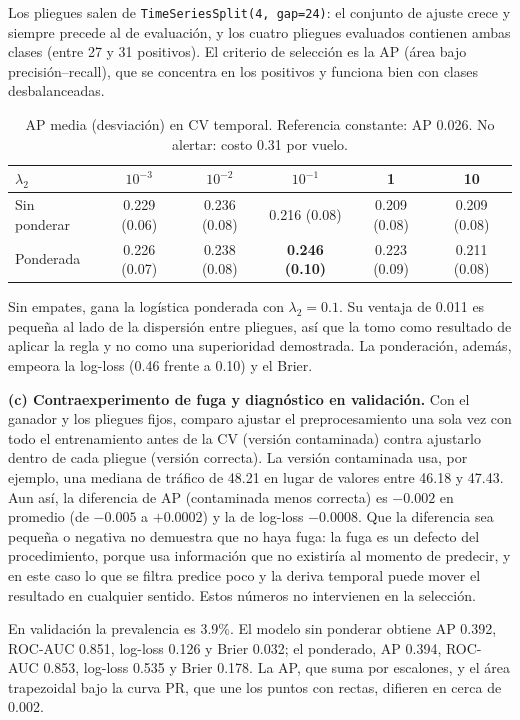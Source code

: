 \documentclass[10pt,a4paper]{article}
\begin{document}
Los pliegues salen de \texttt{TimeSeriesSplit(4, gap=24)}: el conjunto de ajuste crece y siempre precede al de evaluación, y los cuatro pliegues evaluados contienen ambas clases (entre 27 y 31 positivos). El criterio de selección es la AP (área bajo precisión--recall), que se concentra en los positivos y funciona bien con clases desbalanceadas.

\begin{table}[h]\centering\small
\caption{AP media (desviación) en CV temporal. Referencia constante: AP 0.026. No alertar: costo 0.31 por vuelo.}
\begin{tabular}{lccccc}\toprule
$\lambda_2$ & $10^{-3}$ & $10^{-2}$ & $10^{-1}$ & 1 & 10\\\midrule
Sin ponderar & 0.229 (0.06) & 0.236 (0.08) & 0.216 (0.08) & 0.209 (0.08) & 0.209 (0.08)\\
Ponderada & 0.226 (0.07) & 0.238 (0.08) & \textbf{0.246 (0.10)} & 0.223 (0.09) & 0.211 (0.08)\\\bottomrule
\end{tabular}\end{table}

Sin empates, gana la logística ponderada con $\lambda_2=0.1$. Su ventaja de 0.011 es pequeña al lado de la dispersión entre pliegues, así que la tomo como resultado de aplicar la regla y no como una superioridad demostrada. La ponderación, además, empeora la log-loss (0.46 frente a 0.10) y el Brier.

\textbf{(c) Contraexperimento de fuga y diagnóstico en validación.}
Con el ganador y los pliegues fijos, comparo ajustar el preprocesamiento una sola vez con todo el entrenamiento antes de la CV (versión contaminada) contra ajustarlo dentro de cada pliegue (versión correcta). La versión contaminada usa, por ejemplo, una mediana de tráfico de 48.21 en lugar de valores entre 46.18 y 47.43. Aun así, la diferencia de AP (contaminada menos correcta) es $-0.002$ en promedio (de $-0.005$ a $+0.0002$) y la de log-loss $-0.0008$. Que la diferencia sea pequeña o negativa no demuestra que no haya fuga: la fuga es un defecto del procedimiento, porque usa información que no existiría al momento de predecir, y en este caso lo que se filtra predice poco y la deriva temporal puede mover el resultado en cualquier sentido. Estos números no intervienen en la selección.

En validación la prevalencia es 3.9\%. El modelo sin ponderar obtiene AP 0.392, ROC-AUC 0.851, log-loss 0.126 y Brier 0.032; el ponderado, AP 0.394, ROC-AUC 0.853, log-loss 0.535 y Brier 0.178. La AP, que suma por escalones, y el área trapezoidal bajo la curva PR, que une los puntos con rectas, difieren en cerca de 0.002.
\end{document}
